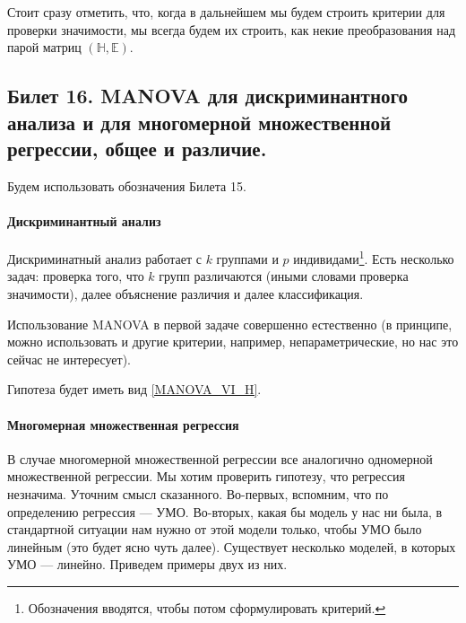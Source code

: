 Стоит сразу отметить, что, когда в дальнейшем мы будем строить критерии для проверки значимости,
мы всегда будем их строить, как некие преобразования над парой матриц $(\mathbb H, \mathbb E)$.

\subsection{Билет 16. MANOVA для дискриминантного анализа и для многомерной множественной регрессии, общее и различие.}

Будем использовать обозначения Билета 15.

\paragraph{Дискриминантный анализ}
Дискриминатный анализ работает с $k$ группами и $p$ индивидами\footnote{Обозначения вводятся, чтобы потом сформулировать критерий.}.
Есть несколько задач: проверка того, что $k$ групп различаются (иными словами
проверка значимости), далее объяснение различия и далее классификация.

Использование MANOVA в первой задаче совершенно естественно (в принципе, можно использовать и другие критерии,
например, непараметрические, но нас это сейчас не интересует).

Гипотеза будет иметь вид \eqref{MANOVA_VI_H}.

\paragraph{Многомерная множественная регрессия}

В случае многомерной множественной регрессии все аналогично одномерной множественной регрессии.
Мы хотим проверить гипотезу, что регрессия незначима.
%
Уточним смысл сказанного. Во-первых, вспомним, что по определению регрессия --- УМО.
Во-вторых, какая бы модель у нас ни была, в стандартной ситуации нам нужно от этой модели только, чтобы УМО было линейным
(это будет ясно чуть далее).
Существует несколько моделей, в которых УМО --- линейно. Приведем примеры двух из них.

